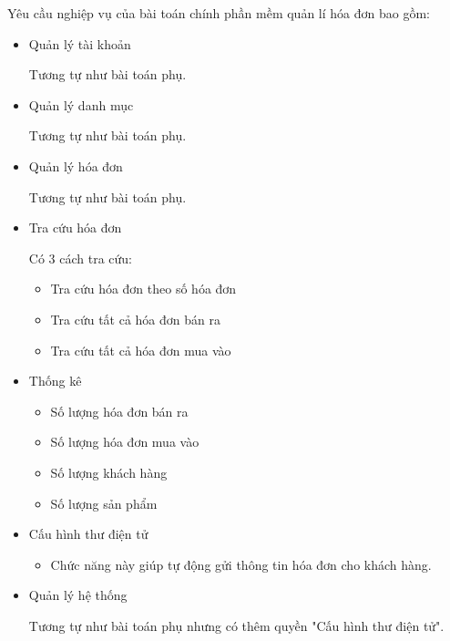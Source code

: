 Yêu cầu nghiệp vụ của bài toán chính phần mềm  quản lí hóa đơn bao gồm:

\begin{itemize}

\item Quản lý tài khoản

Tương tự như bài toán phụ.

\item Quản lý danh mục

Tương tự như bài toán phụ.

\item Quản lý hóa đơn

Tương tự như bài toán phụ.

\item Tra cứu hóa đơn

Có 3 cách tra cứu:

\begin{itemize}

\item Tra cứu hóa đơn theo số hóa đơn

\item Tra cứu tất cả hóa đơn bán ra

\item Tra cứu tất cả hóa đơn mua vào

\end{itemize}

\item Thống kê

\begin{itemize}

\item Số lượng hóa đơn bán ra

\item Số lượng hóa đơn mua vào

\item Số lượng khách hàng

\item Số lượng sản phẩm

\end{itemize}

\item Cấu hình thư điện tử

\begin{itemize}

\item Chức năng này giúp tự động gửi thông tin hóa đơn cho khách hàng.

\end{itemize}

\item Quản lý hệ thống

Tương tự như bài toán phụ nhưng có thêm quyền "Cấu hình thư điện tử".

\end{itemize}
